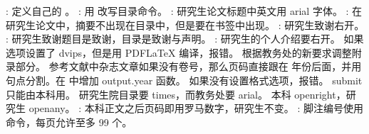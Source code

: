 \markdownRendererUlItem {}: 定义自己的 。\markdownRendererUlItemEnd 
\markdownRendererUlItem {}: 用  改写目录命令。\markdownRendererUlItemEnd 
\markdownRendererUlItem {}: 研究生论文标题中英文用 arial 字体。\markdownRendererUlItemEnd 
\markdownRendererUlItem {}: 在研究生论文中，摘要不出现在目录中，但是要在书签中出现。\markdownRendererUlItemEnd 
\markdownRendererUlItem {}: 研究生致谢右开。\markdownRendererUlItemEnd 
\markdownRendererUlItem {}: 研究生致谢题目是致谢，目录是致谢与声明。\markdownRendererUlItemEnd 
\markdownRendererUlItem {}: 研究生的个人介绍要右开。\markdownRendererUlItemEnd 
\markdownRendererUlEnd \markdownRendererInterblockSeparator
{}
\markdownRendererSectionEnd 
\markdownRendererSectionEnd \markdownRendererSectionBegin
{}\markdownRendererInterblockSeparator
{}\markdownRendererSectionBegin
{}\markdownRendererInterblockSeparator
{}\markdownRendererUlBegin
\markdownRendererUlItem 如果选项设置了 dvips，但是用 PDFLaTeX 编译，报错。\markdownRendererUlItemEnd 
\markdownRendererUlItem 根据教务处的新要求调整附录部分。\markdownRendererUlItemEnd 
\markdownRendererUlItem 参考文献中杂志文章如果没有卷号，那么页码直接跟在 年份后面，并用句点分割。在  中增加 output.year 函数。\markdownRendererUlItemEnd 
\markdownRendererUlItem 如果没有设置格式选项，报错。\markdownRendererUlItemEnd 
\markdownRendererUlItem submit 只能由本科用。\markdownRendererUlItemEnd 
\markdownRendererUlItem 研究生院目录要 times，而教务处要 arial。\markdownRendererUlItemEnd 
\markdownRendererUlItem 本科 openright，研究生 openany。\markdownRendererUlItemEnd 
\markdownRendererUlItem {}: 本科正文之后页码即用罗马数字，研究生不变。\markdownRendererUlItemEnd 
\markdownRendererUlItem {}: 脚注编号使用  命令，每页允许至多 99 个。\markdownRendererUlItemEnd 
